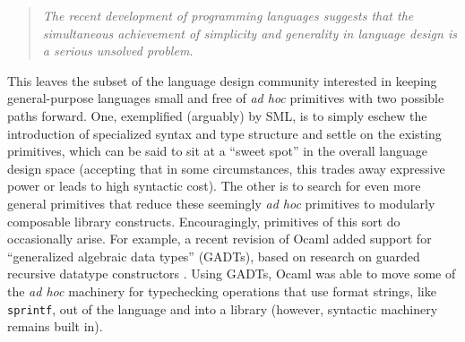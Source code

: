 \begin{quote}\textit{The recent development of programming languages suggests that the simul\-taneous achievement of simplicity 
and generality in language design is a serious unsolved 
problem.}%
\end{quote}

\newpage %
This leaves the subset of the  language design community interested in keeping general-purpose languages small and free of \emph{ad hoc} primitives with two possible paths forward. One, exemplified (arguably) by SML, is to simply eschew the introduction of specialized syntax and type structure and settle on the existing primitives, which can be said to sit at a ``sweet spot'' in the overall language design space (accepting that in some circumstances, this trades away expressive power or leads to  high syntactic cost). %
The other is to search for even more general primitives that reduce these seemingly \emph{ad hoc} primitives to modularly composable library constructs. %
Encouragingly, primitives of this sort do occasionally arise. For example, a recent revision of Ocaml added support for  ``generalized algebraic data types'' (GADTs), based on research on guarded recursive datatype constructors \cite{XiCheChe03}. Using GADTs, Ocaml was able to move some of the \emph{ad hoc} machinery for typechecking operations that use format strings, like \texttt{sprintf}, out of the language and into a library (however, syntactic machinery remains built in). 





